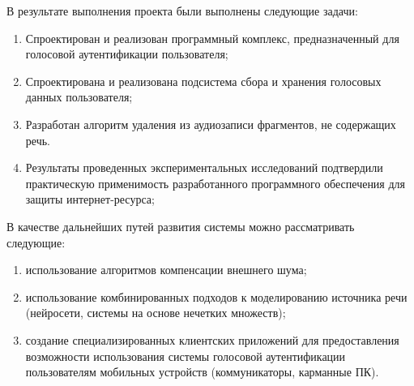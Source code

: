 \Outtro

В результате выполнения проекта были выполнены следующие задачи:

\begin{enumerate}
\item Спроектирован и реализован программный комплекс, предназначенный для
голосовой аутентификации
пользователя;
\item Спроектирована и реализована подсистема сбора и хранения голосовых данных
пользователя;
\item Разработан алгоритм удаления из аудиозаписи фрагментов, не содержащих
речь.
\item Результаты проведенных экспериментальных исследований 
подтвердили практическую применимость разработанного программного обеспечения для защиты интернет-ресурса;
\end{enumerate}

В качестве дальнейших путей развития системы можно рассматривать следующие:

\begin{enumerate}
\item использование алгоритмов компенсации внешнего шума;
\item использование комбинированных подходов к моделированию источника речи
(нейросети, системы на основе нечетких множеств);
\item создание специализированных клиентских приложений для предоставления
возможности использования системы
голосовой аутентификации пользователям мобильных устройств (коммуникаторы,
карманные ПК).
\end{enumerate}

